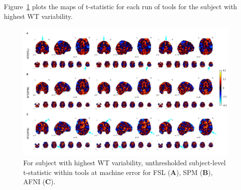 \documentclass[11pt,onecolumn]{article}
\begin{document}
Figure~\ref{fig:unthresh-worst-sbj} plots the maps of t-statistic
for each run of tools for the subject with highest WT variability.

\begin{figure}[ht]
  \centering
  \includegraphics[width=\textwidth]{figures/4-marked.pdf}
  \caption{For subject with highest WT variability, unthresholded subject-level t-statistic
  within tools at machine error for FSL (\textbf{A}),
  SPM (\textbf{B}), AFNI (\textbf{C}).}%
  \label{fig:unthresh-worst-sbj}
\end{figure}
\end{document}
